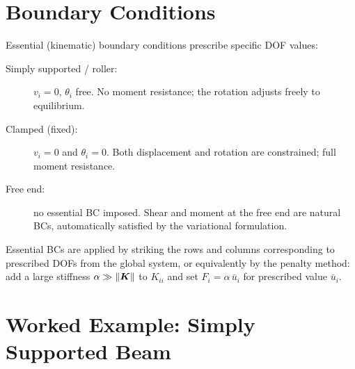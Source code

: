 \section{Boundary Conditions}
\label{sec:beam_bc}

Essential (kinematic) boundary conditions prescribe specific DOF values:

\begin{description}
\item[Simply supported / roller:] $v_i = 0$, $\theta_i$ free. No moment
  resistance; the rotation adjusts freely to equilibrium.
\item[Clamped (fixed):] $v_i = 0$ and $\theta_i = 0$. Both displacement and
  rotation are constrained; full moment resistance.
\item[Free end:] no essential BC imposed. Shear and moment at the free end
  are natural BCs, automatically satisfied by the variational formulation.
\end{description}

Essential BCs are applied by striking the rows and columns corresponding to
prescribed DOFs from the global system, or equivalently by the penalty method:
add a large stiffness $\alpha \gg \|\bm{K}\|$ to $K_{ii}$ and set $F_i =
\alpha\,\bar{u}_i$ for prescribed value $\bar{u}_i$.

\section{Worked Example: Simply Supported Beam}

